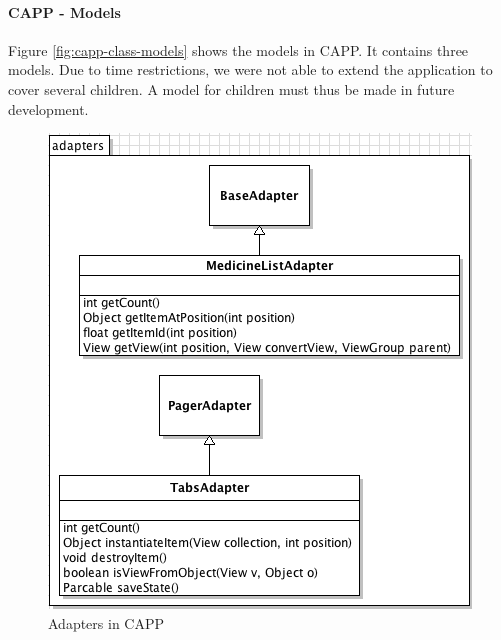 \paragraph{CAPP - Models}
Figure \ref{fig:capp-class-models} shows the models in CAPP.
It contains three models. Due to time restrictions, we were not able to extend the application to cover several children.
A model for children must thus be made in future development. 

\begin{figure}
	\begin{minipage}[b]{0.44\linewidth}
		\centering
			\includegraphics[width=\linewidth]{Pictures/ArchPictures/capparchpictures/capp_adapters.png}
		\caption{Adapters in CAPP}
		\label{fig:class-diagram-child-adapters}
	\end{minipage}
	\hspace{0.1\linewidth}
	\begin{minipage}[b]{0.44\linewidth}
		\centering

\end{minipage}
\end{figure}
